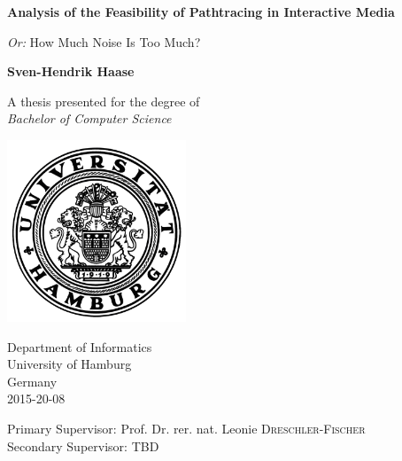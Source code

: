\begin{titlepage}
    \begin{center}
        \Huge
        \textbf{Analysis of the Feasibility of Pathtracing in Interactive Media}
        
        \vspace{0.5cm}

        \LARGE
        \textit{Or:} How Much Noise Is Too Much?
        
        \vspace{1.5cm}
        
        \textbf{Sven-Hendrik Haase}
        
        \vfill
        
        A thesis presented for the degree of\\
        \emph{Bachelor of Computer Science}
        
        \vspace{0.8cm}
        
        \includegraphics[width=0.4\textwidth]{frontbackmatter/uni-siegel.png}
        
        \Large
        Department of Informatics\\
        University of Hamburg\\
        Germany\\
        2015-20-08

        \vspace{0.8cm}

        \large
        Primary Supervisor: Prof. Dr. rer. nat. Leonie \textsc{Dreschler-Fischer}\\
        Secondary Supervisor: \textsc{TBD}
        
    \end{center}
\end{titlepage}
